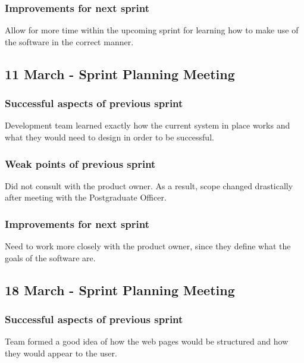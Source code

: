 \documentclass[journal,comsoc,onecolumn]{IEEEtran}
\begin{document}
\subsubsection{Improvements for next sprint}
\hfill \break Allow for more time within the upcoming sprint for learning how to make use of the software in the correct manner.


\subsection{11 March - Sprint Planning Meeting}

\subsubsection{Successful aspects of previous sprint}
\hfill \break Development team learned exactly how the current system in place works and what they would need to design in order to be successful.

\subsubsection{Weak points of previous sprint}
\hfill \break Did not consult with the product owner. As a result, scope changed drastically after meeting with the Postgraduate Officer.

\subsubsection{Improvements for next sprint}
\hfill \break Need to work more closely with the product owner, since they define what the goals of the software are.


\subsection{18 March - Sprint Planning Meeting}

\subsubsection{Successful aspects of previous sprint}
\hfill \break Team formed a good idea of how the web pages would be structured and how they would appear to the user.
\end{document}
